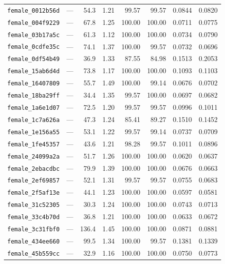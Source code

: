 \begin{longtable}{lrrrrrrr}
\texttt{female\_0012b56d} & --- & 54.3 & 1.21 & 99.57 & 99.57 & 0.0844 & 0.0820 \\
\texttt{female\_004f9229} & --- & 67.8 & 1.25 & 100.00 & 100.00 & 0.0711 & 0.0775 \\
\texttt{female\_03b17a5c} & --- & 61.3 & 1.12 & 100.00 & 100.00 & 0.0734 & 0.0790 \\
\texttt{female\_0cdfe35c} & --- & 74.1 & 1.37 & 100.00 & 99.57 & 0.0732 & 0.0696 \\
\texttt{female\_0df54b49} & --- & 36.9 & 1.33 & 87.55 & 84.98 & 0.1513 & 0.2053 \\
\texttt{female\_15ab6d4d} & --- & 73.8 & 1.17 & 100.00 & 100.00 & 0.1093 & 0.1103 \\
\texttt{female\_16407809} & --- & 55.7 & 1.49 & 100.00 & 99.14 & 0.0676 & 0.0702 \\
\texttt{female\_18ba29ff} & --- & 34.4 & 1.35 & 99.57 & 100.00 & 0.0697 & 0.0682 \\
\texttt{female\_1a6e1d07} & --- & 72.5 & 1.20 & 99.57 & 99.57 & 0.0996 & 0.1011 \\
\texttt{female\_1c7a626a} & --- & 47.3 & 1.24 & 85.41 & 89.27 & 0.1510 & 0.1452 \\
\texttt{female\_1e156a55} & --- & 53.1 & 1.22 & 99.57 & 99.14 & 0.0737 & 0.0709 \\
\texttt{female\_1fe45357} & --- & 43.6 & 1.21 & 98.28 & 99.57 & 0.1011 & 0.0896 \\
\texttt{female\_24099a2a} & --- & 51.7 & 1.26 & 100.00 & 100.00 & 0.0620 & 0.0637 \\
\texttt{female\_2ebacdbc} & --- & 79.9 & 1.39 & 100.00 & 100.00 & 0.0676 & 0.0663 \\
\texttt{female\_2ef69857} & --- & 52.1 & 1.31 & 99.57 & 99.57 & 0.0755 & 0.0683 \\
\texttt{female\_2f5af13e} & --- & 44.1 & 1.23 & 100.00 & 100.00 & 0.0597 & 0.0581 \\
\texttt{female\_31c52305} & --- & 30.3 & 1.24 & 100.00 & 100.00 & 0.0743 & 0.0713 \\
\texttt{female\_33c4b70d} & --- & 36.8 & 1.21 & 100.00 & 100.00 & 0.0633 & 0.0672 \\
\texttt{female\_3c31fbf0} & --- & 136.4 & 1.45 & 100.00 & 100.00 & 0.0871 & 0.0881 \\
\texttt{female\_434ee660} & --- & 99.5 & 1.34 & 100.00 & 99.57 & 0.1381 & 0.1339 \\
\texttt{female\_45b559cc} & --- & 32.9 & 1.16 & 100.00 & 100.00 & 0.0750 & 0.0773 \\

\end{longtable}
